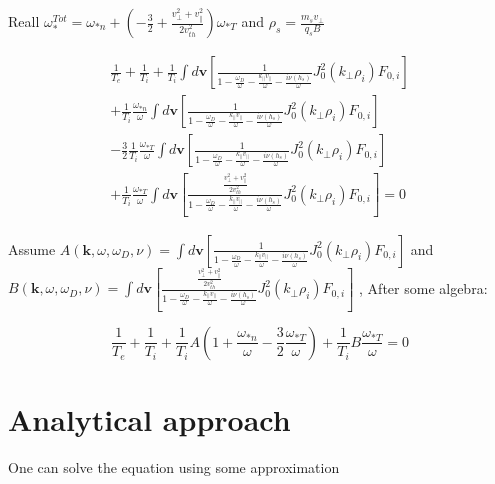 Reall $\omega_{*}^{T o t}=\omega_{* n}+\left(-\frac{3}{2}+\frac{v_{\perp}^{2}+v_{ \|}^{2}}{2 v_{t h}^{2}}\right) \omega_{* T}$ and $\rho_s=\frac{m_sv_\perp}{q_sB}$

\begin{equation}
\begin{aligned}
   \frac{1}{T_e} + \frac{1}{T_i}+\frac{1}{T_i} 
   \int d\textbf{v} \left[
\frac{1 
    }{1 -\frac{\omega_D }{\omega}
    - \frac{k_{||}v_{||}}{\omega}-\frac{i\nu(h_s)}{\omega}}J_0^2(k_\perp\rho_i)F_{0,i}
 \right]
 \\
 +\frac{1}{T_i}\frac{\omega_{*n}}{\omega} 
   \int d\textbf{v} \left[
\frac{1 
    }{1 -\frac{\omega_D }{\omega}
    - \frac{k_{||}v_{||}}{\omega}-\frac{i\nu(h_s)}{\omega}}J_0^2(k_\perp\rho_i)F_{0,i}
 \right]
 \\
  -\frac{3}{2}\frac{1}{T_i} \frac{\omega_{*T} }{\omega}
   \int d\textbf{v} \left[
\frac{1 
    }{1 -\frac{\omega_D }{\omega}
    - \frac{k_{||}v_{||}}{\omega}-\frac{i\nu(h_s)}{\omega}}J_0^2(k_\perp\rho_i)F_{0,i}
 \right]
  \\
  +\frac{1}{T_i} \frac{\omega_{*T} }{\omega}
   \int d\textbf{v} \left[
\frac{\frac{v_{\perp}^{2}+v_{ \|}^{2}}{2 v_{t h}^{2}} 
    }{1 -\frac{\omega_D }{\omega}
    - \frac{k_{||}v_{||}}{\omega}-\frac{i\nu(h_s)}{\omega}}J_0^2(k_\perp\rho_i)F_{0,i}
 \right]
 =0
 \end{aligned}
\end{equation}

Assume $A(\textbf{k},\omega, \omega_D ,\nu)=
\int d\textbf{v} \left[
\frac{1 
    }{1 -\frac{\omega_D }{\omega}
    - \frac{k_{||}v_{||}}{\omega}-\frac{i\nu(h_s)}{\omega}}J_0^2(k_\perp\rho_i)F_{0,i}
 \right]
$ and 
$B(\textbf{k},\omega, \omega_D,\nu)=
\int d\textbf{v} \left[
\frac{\frac{v_{\perp}^{2}+v_{ \|}^{2}}{2 v_{t h}^{2}}  
    }{1 -\frac{\omega_D }{\omega}
    - \frac{k_{||}v_{||}}{\omega}-\frac{i\nu(h_s)}{\omega}}J_0^2(k_\perp\rho_i)F_{0,i}
 \right]
$ , After some algebra:

\begin{equation}
    \frac{1}{T_e}+
    \frac{1}{T_i}+
    \frac{1}{T_i}A\left(1+\frac{\omega_{*n}}{\omega}-\frac{3}{2}\frac{\omega_{*T}}{\omega}\right)+\frac{1}{T_i} B\frac{\omega_{*T}}{\omega}=0
\end{equation}

\section{Analytical approach}

One can solve the equation using some approximation

